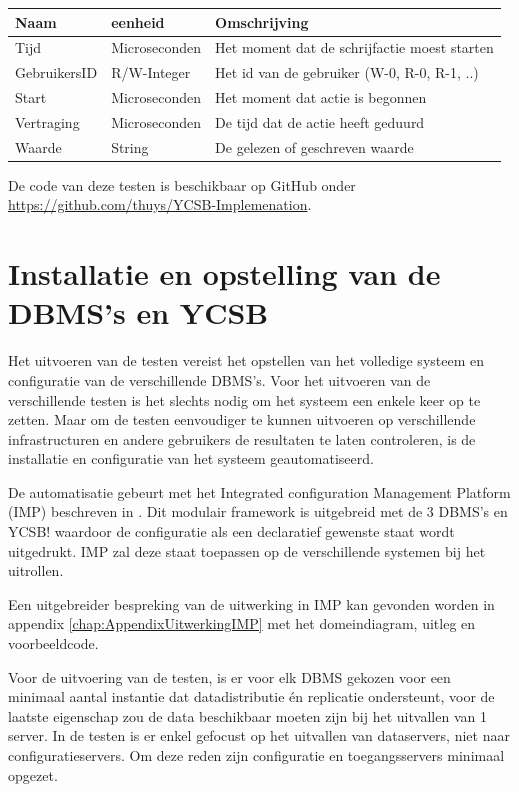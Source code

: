 \begin{table}[ht!]
\centering
		\begin{tabular}{l|l|l}
			\textbf{Naam} & \textbf{eenheid} & \textbf{Omschrijving} \\ 
			\hline Tijd & Microseconden & Het moment dat de schrijfactie moest starten\\ 
			GebruikersID & R/W-Integer & Het id van de gebruiker (W-0, R-0, R-1, ..) \\ 
			Start & Microseconden & Het moment dat actie is begonnen \\
			Vertraging & Microseconden & De tijd dat de actie heeft geduurd \\ 
			Waarde & String & De gelezen of geschreven waarde \\ 
		\end{tabular} 
	\label{table:consistentieuitvoer}
\end{table}

De code van deze testen is beschikbaar op GitHub onder  \url{https://github.com/thuys/YCSB-Implemenation}. 

\section{Installatie en opstelling van de DBMS's en YCSB}
Het uitvoeren van de testen vereist het opstellen van het volledige systeem en configuratie van de verschillende DBMS's. Voor het uitvoeren van de verschillende testen is het slechts nodig om het systeem een enkele keer op te zetten. Maar om de testen eenvoudiger te kunnen uitvoeren op verschillende infrastructuren en andere gebruikers de resultaten te laten controleren, is de installatie en configuratie van het systeem geautomatiseerd. 

De automatisatie gebeurt met het Integrated configuration Management Platform (IMP) beschreven in \cite{KULeuven-453199}. Dit modulair framework is uitgebreid met de 3 DBMS's en YCSB! waardoor de configuratie als een declaratief gewenste staat wordt uitgedrukt. IMP zal deze staat toepassen op de verschillende systemen bij het uitrollen. 

Een uitgebreider bespreking van de uitwerking in IMP kan gevonden worden in appendix \ref{chap:AppendixUitwerkingIMP} met het domeindiagram, uitleg en voorbeeldcode. 

Voor de uitvoering van de testen, is er voor elk DBMS gekozen voor een minimaal aantal instantie dat datadistributie én replicatie ondersteunt, voor de laatste eigenschap zou de data beschikbaar moeten zijn bij het uitvallen van 1 server. In de testen is er enkel gefocust op het uitvallen van dataservers, niet naar configuratieservers. Om deze reden zijn configuratie en toegangsservers minimaal opgezet. 

